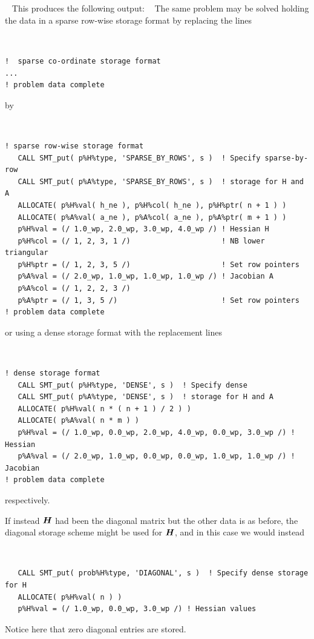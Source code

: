 \documentclass{galahad}
\begin{document}
{\tt \small
\VerbatimInput{\packageexample}
}
\noindent
This produces the following output:
{\tt \small
\VerbatimInput{\packageresults}
}
\noindent
The same problem may be solved holding the data in 
a sparse row-wise storage format by replacing the lines
{\tt \small
\begin{verbatim}
!  sparse co-ordinate storage format
...
! problem data complete   
\end{verbatim}
}
\noindent
by
{\tt \small
\begin{verbatim}
! sparse row-wise storage format
   CALL SMT_put( p%H%type, 'SPARSE_BY_ROWS', s )  ! Specify sparse-by-row
   CALL SMT_put( p%A%type, 'SPARSE_BY_ROWS', s )  ! storage for H and A
   ALLOCATE( p%H%val( h_ne ), p%H%col( h_ne ), p%H%ptr( n + 1 ) )
   ALLOCATE( p%A%val( a_ne ), p%A%col( a_ne ), p%A%ptr( m + 1 ) )
   p%H%val = (/ 1.0_wp, 2.0_wp, 3.0_wp, 4.0_wp /) ! Hessian H
   p%H%col = (/ 1, 2, 3, 1 /)                     ! NB lower triangular
   p%H%ptr = (/ 1, 2, 3, 5 /)                     ! Set row pointers
   p%A%val = (/ 2.0_wp, 1.0_wp, 1.0_wp, 1.0_wp /) ! Jacobian A
   p%A%col = (/ 1, 2, 2, 3 /)
   p%A%ptr = (/ 1, 3, 5 /)                        ! Set row pointers  
! problem data complete   
\end{verbatim}
}
\noindent
or using a dense storage format with the replacement lines
{\tt \small
\begin{verbatim}
! dense storage format
   CALL SMT_put( p%H%type, 'DENSE', s )  ! Specify dense
   CALL SMT_put( p%A%type, 'DENSE', s )  ! storage for H and A
   ALLOCATE( p%H%val( n * ( n + 1 ) / 2 ) )
   ALLOCATE( p%A%val( n * m ) )
   p%H%val = (/ 1.0_wp, 0.0_wp, 2.0_wp, 4.0_wp, 0.0_wp, 3.0_wp /) ! Hessian
   p%A%val = (/ 2.0_wp, 1.0_wp, 0.0_wp, 0.0_wp, 1.0_wp, 1.0_wp /) ! Jacobian
! problem data complete   
\end{verbatim}
}
\noindent
respectively.

If instead ${\bm{H}}$ had been the diagonal matrix
but the other data is as before, the diagonal storage scheme 
might be used for ${\bm{H}}$, and in this case we would instead 
{\tt \small
\begin{verbatim}
   CALL SMT_put( prob%H%type, 'DIAGONAL', s )  ! Specify dense storage for H
   ALLOCATE( p%H%val( n ) )
   p%H%val = (/ 1.0_wp, 0.0_wp, 3.0_wp /) ! Hessian values
\end{verbatim}
}
\noindent
Notice here that zero diagonal entries are stored.
\end{document}
